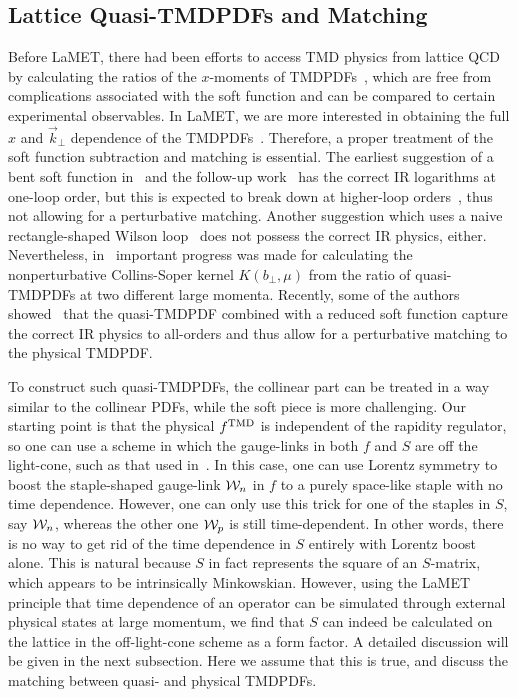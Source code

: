 

\subsection{Lattice Quasi-TMDPDFs and Matching}
\label{sec:quasitmd}
Before LaMET, there had been efforts to access TMD physics from lattice QCD by calculating the ratios of the $x$-moments of TMDPDFs~\cite{Hagler:2009mb,Musch:2010ka,Musch:2011er,Engelhardt:2015xja,Yoon:2017qzo}, which are free from complications associated with the soft function and can be compared to certain experimental observables. In LaMET, we are more interested in obtaining the full $x$ and $\vec{k}_\perp$ dependence of the TMDPDFs~\cite{Ji:2014hxa,Ji:2018hvs,Ebert:2018gzl,Ebert:2019okf,Ji:2019sxk,Ji:2019ewn}. Therefore, a proper treatment of the soft function subtraction and matching is essential.
The earliest suggestion of a bent soft function in~\cite{Ji:2014hxa} and the follow-up work~\cite{Ebert:2019okf} has the correct IR logarithms at one-loop order, but this is expected to break down at higher-loop orders~\cite{Ji:2019sxk}, thus not allowing for a perturbative matching. Another suggestion which uses a naive rectangle-shaped Wilson loop~\cite{Ji:2018hvs,Ebert:2019okf} does not possess the correct IR physics, either. Nevertheless, in~\cite{Ebert:2018gzl} important progress was made for calculating the nonperturbative
Collins-Soper kernel $K(b_\perp,\mu)$ from the ratio of quasi-TMDPDFs at two different large momenta.
Recently, some of the authors showed~\cite{Ji:2019sxk,Ji:2019ewn} that the quasi-TMDPDF combined with a reduced soft function capture the correct IR physics to all-orders and thus allow for a perturbative matching to the physical TMDPDF.

To construct such quasi-TMDPDFs, the collinear part can be treated in a way similar to the collinear PDFs, while the soft
piece is more challenging. Our starting point is that the physical $f^{\rm TMD}$ is independent of the rapidity regulator, so one can use a scheme in which the gauge-links in both $f$ and $S$
are off the light-cone, such as that used in~\cite{Collins:2011zzd}. In this case, one can use Lorentz symmetry to
boost the staple-shaped gauge-link ${\cal W}_n$ in $f$ to a purely space-like staple
with no time dependence. However, one can only use
this trick for one of the staples in $S$, say ${\cal W}_n$, whereas the other one
${\cal W}_p$ is still time-dependent. In other words, there is no way to get rid of the time dependence
in $S$ entirely with Lorentz boost alone. This is natural because $S$ in fact represents the square of
an $S$-matrix, which appears to be intrinsically Minkowskian. However, using the LaMET principle that time
dependence of an operator can be simulated through external physical states at large momentum, we find that
$S$ can indeed be calculated on the lattice in the off-light-cone scheme as a form factor. A detailed discussion will be given in
the next subsection. Here we assume that this is true, and discuss the matching between
quasi- and physical TMDPDFs.

